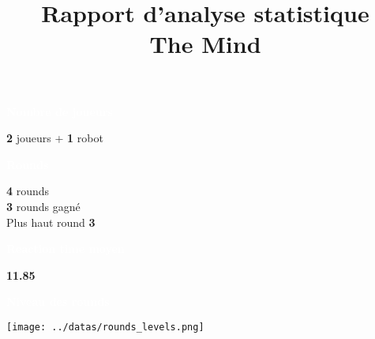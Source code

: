 \documentclass[a4paper,11pt,landscape]{article}
\title{\vspace{-1cm}\Huge \textbf{Rapport d'analyse statistique} \\ \Large The Mind\vspace{-1cm}}
\date{}
\begin{document}
\color{white}
\maketitle
\begin{multicols}{2} %
    \noindent
    \begin{tcolorbox}[colback=ora2,colframe=ora2]
        \begin{tcolorbox}[colback=ora1,colframe=ora1]
            \centering \textcolor{white}{\textbf{Nombre de joueurs}}
        \end{tcolorbox}
    \centering \textbf{
2
    } joueurs + \textbf{
    1
    } robot

    \begin{tcolorbox}[colback=ora1,colframe=ora1]
        \centering \textcolor{white}{\textbf{Rounds}}
    \end{tcolorbox}
        \centering \textbf{
4
        } rounds \\
        \centering \textbf{
3
        } rounds gagné \\
        \centering Plus haut round \textbf{
3
        }

    \begin{tcolorbox}[colback=ora1,colframe=ora1]
        \centering \textcolor{white}{\textbf{Reaction time moyen}}
    \end{tcolorbox}
     \centering \textbf{
11.85
        }

    \end{tcolorbox}

    \vfill

    \noindent
    \begin{tcolorbox}[colback=ora2,colframe=ora2]
        \begin{tcolorbox}[colback=ora1,colframe=ora1]
            \centering \textcolor{white}{\textbf{Niveau des rounds}}
        \end{tcolorbox}
            \centering \texttt{[image: ../datas/rounds\_levels.png]}


    \end{tcolorbox}
    \vfill
\end{multicols}
\end{document}
